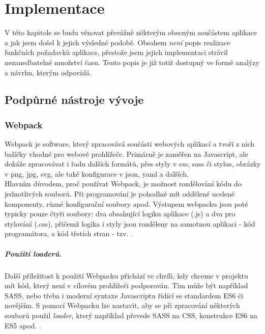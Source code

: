 \chapter{Implementace}\label{implementation}

V této kapitole se budu věnovat převážně některým obecným součástem aplikace a jak jsem došel k jejich výsledné podobě. Obsahem \emph{není} popis realizace funkčních požadavků aplikace, přestože jsem jejich implementaci strávil nezanedbatelné množství času. Tento popis je již totiž dostupný ve formě analýzy a návrhu, kterým odpovídá.\\


\section{Podpůrné nástroje vývoje}

\subsection{Webpack}

Webpack \cite{webpack} je software, který zpracovává součásti webových aplikací a tvoří z nich balíčky vhodné pro webové prohlížeče. Primárně je zaměřen na Javascript, ale dokáže zpracovávat i řadu dalších formátů, přes styly v css, sass či stylus, obrázky v png, jpg, svg, ale také konfigurace v json, yaml a dalších.\\
Hlavním důvodem, proč používat Webpack, je možnost rozdělování kódu do jednotlivých souborů. Při programování je pohodlné mít oddělené ucelené komponenty, různé konfigurační soubory apod. Výstupem webpacku jsou poté typicky pouze čtyři soubory: dva obsahující logiku aplikace (.js) a dva pro stylování (.css), přičemž logika i styly jsou rozděleny na samotnou aplikaci - kód programátora, a kód třetích stran - tzv. .

\paragraph{Použití loaderů.} Další příležitost k použití Webpacku přichází ve chvíli, kdy chceme v projektu mít kód, který není v cílovém prohlížeči podporován. Tím může být například SASS, nebo třeba i moderní syntaxe Javascriptu řídící se standardem ES6 či novějším. S pomocí Webpacku lze nastavit, aby se při zpracování některých souborů použil \emph{loader}, který například převede SASS na CSS, konstrukce ES6 na ES5 apod. \cite{webpack-ackee}.

